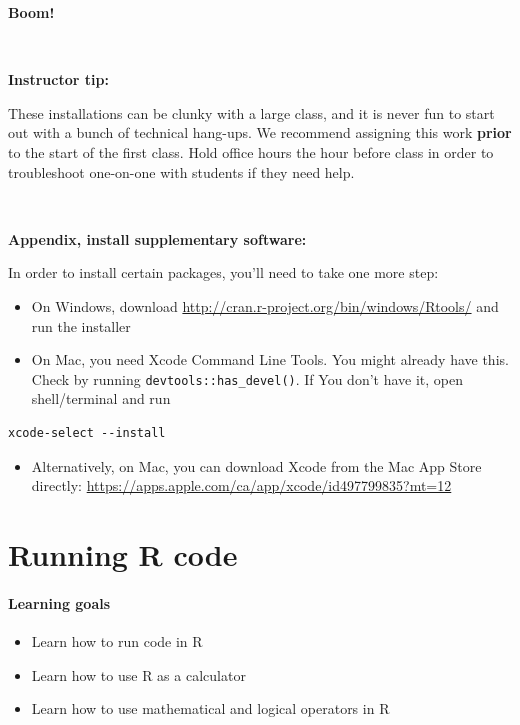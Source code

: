 \documentclass[]{book}
\providecommand{\tightlist}{%
  \setlength{\itemsep}{0pt}\setlength{\parskip}{0pt}}
\begin{document}
\textbf{Boom!}

~

\leavevmode\hypertarget{tip-text}{}%
\textbf{Instructor tip:}

These installations can be clunky with a large class, and it is never fun to start out with a bunch of technical hang-ups. We recommend assigning this work \textbf{prior} to the start of the first class. Hold office hours the hour before class in order to troubleshoot one-on-one with students if they need help.

~

\textbf{Appendix, install supplementary software:}

In order to install certain packages, you'll need to take one more step:

\begin{itemize}
\tightlist
\item
  On Windows, download \url{http://cran.r-project.org/bin/windows/Rtools/} and run the installer
\item
  On Mac, you need Xcode Command Line Tools. You might already have this. Check by running \texttt{devtools::has\_devel()}. If You don't have it, open shell/terminal and run
\end{itemize}

\begin{verbatim}
xcode-select --install
\end{verbatim}

\begin{itemize}
\tightlist
\item
  Alternatively, on Mac, you can download Xcode from the Mac App Store directly: \url{https://apps.apple.com/ca/app/xcode/id497799835?mt=12}
\end{itemize}

\hypertarget{running-r-code}{%
\chapter{Running R code}\label{running-r-code}}

\hypertarget{learning-goals}{%
\subsubsection*{Learning goals}\label{learning-goals}}

\begin{itemize}
\tightlist
\item
  Learn how to run code in R
\item
  Learn how to use R as a calculator
\item
  Learn how to use mathematical and logical operators in R
\end{itemize}
\end{document}
